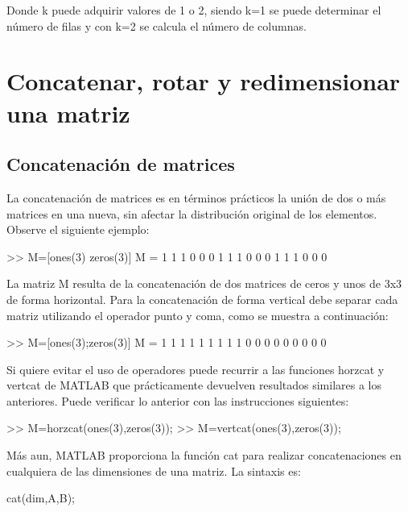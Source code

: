 Donde k puede adquirir valores de 1 o 2, siendo k=1 se puede determinar
el número de filas y con k=2 se calcula el número de columnas.

\section{Concatenar, rotar y redimensionar una matriz}\label{concatenar-rotar-y-redimensionar-una-matriz}

\subsection{Concatenación de matrices}\label{concatenacion-de-matrices}

La concatenación de matrices es en términos prácticos la unión de dos o
más matrices en una nueva, sin afectar la distribución original de los
elementos. Observe el siguiente ejemplo:

\begin{matlab}
>> M=[ones(3) zeros(3)]
M =
     1     1     1     0     0     0
     1     1     1     0     0     0
     1     1     1     0     0     0
\end{matlab}

La matriz M resulta de la concatenación de dos matrices de ceros y unos
de 3x3 de forma horizontal. Para la concatenación de forma vertical debe
separar cada matriz utilizando el operador punto y coma, como se muestra
a continuación:

\begin{matlab}
>> M=[ones(3);zeros(3)]
M =
     1     1     1
     1     1     1
     1     1     1
     0     0     0
     0     0     0
     0     0     0
\end{matlab}

Si quiere evitar el uso de operadores puede recurrir a las funciones
horzcat y vertcat de MATLAB que prácticamente devuelven resultados
similares a los anteriores. Puede verificar lo anterior con las
instrucciones siguientes:

\begin{matlab}
>> M=horzcat(ones(3),zeros(3));
>> M=vertcat(ones(3),zeros(3));
\end{matlab}

Más aun, MATLAB proporciona la función cat para realizar concatenaciones
en cualquiera de las dimensiones de una matriz. La sintaxis es:

\begin{matlab}
cat(dim,A,B);
\end{matlab}

